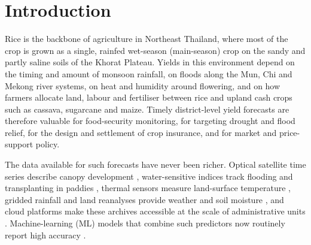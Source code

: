 \section{Introduction}\label{sec:intro}

Rice is the backbone of agriculture in Northeast Thailand, where most of the crop is grown as a single, rainfed wet-season (main-season) crop on the sandy and partly saline soils of the Khorat Plateau. Yields in this environment depend on the timing and amount of monsoon rainfall, on floods along the Mun, Chi and Mekong river systems, on heat and humidity around flowering, and on how farmers allocate land, labour and fertiliser between rice and upland cash crops such as cassava, sugarcane and maize. Timely district-level yield forecasts are therefore valuable for food-security monitoring, for targeting drought and flood relief, for the design and settlement of crop insurance, and for market and price-support policy.

The data available for such forecasts have never been richer. Optical satellite time series describe canopy development \citep{tucker1979red,huete2002overview}, water-sensitive indices track flooding and transplanting in paddies \citep{gao1996ndwi,xiao2005mapping}, thermal sensors measure land-surface temperature \citep{wan2008new}, gridded rainfall and land reanalyses provide weather and soil moisture \citep{funk2015climate,munozsabater2021era5}, and cloud platforms make these archives accessible at the scale of administrative units \citep{gorelick2017google}. Machine-learning (ML) models that combine such predictors now routinely report high accuracy \citep{jeong2016random,cai2019integrating,khaki2019crop,vanklompenburg2020crop}.

